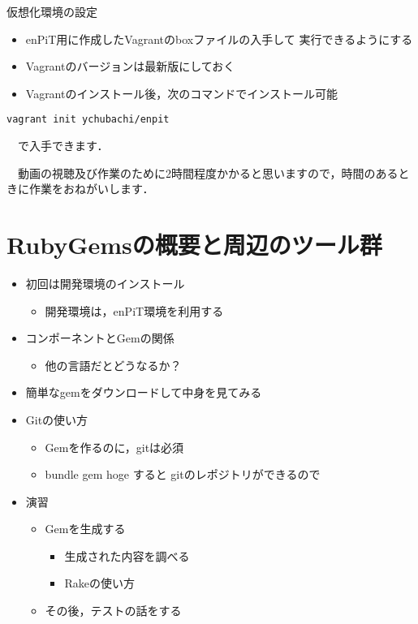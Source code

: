 \documentclass[t, aspectratio=169]{beamer}
\begin{document}
\begin{frame}[fragile,label=sec-1-1-6]{仮想化環境の設定}
 \begin{itemize}
\item enPiT用に作成したVagrantのboxファイルの入手して
実行できるようにする

\item Vagrantのバージョンは最新版にしておく

\item Vagrantのインストール後，次のコマンドでインストール可能
\end{itemize}

\begin{verbatim}
vagrant init ychubachi/enpit
\end{verbatim}

　で入手できます．


　動画の視聴及び作業のために2時間程度かかると思いますので，時間のあるときに作業をおねがいします．
\end{frame}


\part{RubyGemsの概要と周辺のツール群}
\label{sec-2}

\begin{itemize}
\item 初回は開発環境のインストール
\begin{itemize}
\item 開発環境は，enPiT環境を利用する
\end{itemize}
\item コンポーネントとGemの関係
\begin{itemize}
\item 他の言語だとどうなるか？
\end{itemize}
\item 簡単なgemをダウンロードして中身を見てみる
\item Gitの使い方
\begin{itemize}
\item Gemを作るのに，gitは必須
\item bundle gem hoge すると gitのレポジトリができるので
\end{itemize}
\item 演習
\begin{itemize}
\item Gemを生成する
\begin{itemize}
\item 生成された内容を調べる
\item Rakeの使い方
\end{itemize}
\item その後，テストの話をする
\end{itemize}
\end{itemize}
\end{document}
